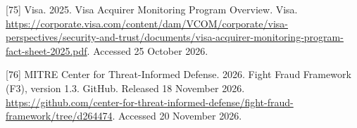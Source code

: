 \documentclass[acmlarge,review,anonymous,nonacm]{acmart}
\newlength{\cslhangindent}
\newlength{\cslentryspacingunit} %
\newenvironment{CSLReferences}[2] %
 {\bibliofont %
  \setlength{\parindent}{0pt}
  \ifodd #1
  \let\oldpar\par
  \def\par{\hangindent=\cslhangindent\oldpar}
  \fi
  \setlength{\parskip}{#2\cslentryspacingunit}
 }%
 {}
\begin{document}
\begin{CSLReferences}{1}{1}
\leavevmode{}%
{[}75{]} Visa. 2025. Visa Acquirer Monitoring Program Overview. Visa.
\url{https://corporate.visa.com/content/dam/VCOM/corporate/visa-perspectives/security-and-trust/documents/visa-acquirer-monitoring-program-fact-sheet-2025.pdf}.
Accessed 25 October 2026.

\leavevmode{}%
{[}76{]} MITRE Center for Threat-Informed Defense. 2026. Fight Fraud
Framework (F3), version 1.3. GitHub. Released 18 November 2026.
\url{https://github.com/center-for-threat-informed-defense/fight-fraud-framework/tree/d264474}.
Accessed 20 November 2026.

\end{CSLReferences}
\end{document}
